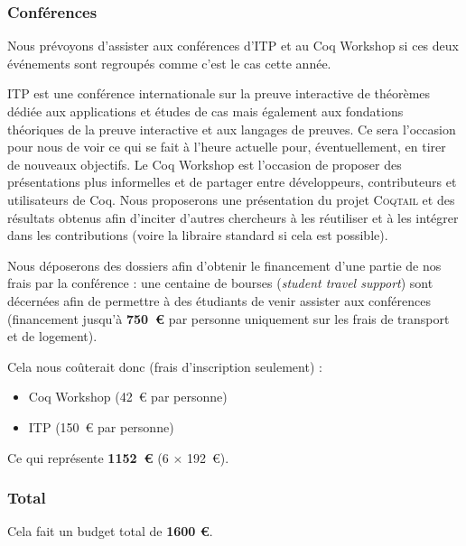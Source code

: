 \documentclass[11pt]{article}
\newcommand{\coqtail}{\textsc{Coqtail}}
\begin{document}
\subsubsection{Conférences}
Nous prévoyons d'assister aux conférences d'ITP et au Coq Workshop si ces deux événements sont regroupés comme c'est le cas cette année.

ITP est une conférence internationale sur la preuve interactive de théorèmes dédiée aux applications et études de cas mais également aux fondations théoriques de la preuve interactive et aux langages de preuves. Ce sera l'occasion pour nous de voir ce qui se fait à l'heure actuelle pour, éventuellement, en tirer de nouveaux objectifs. Le Coq Workshop est l'occasion de proposer des présentations plus informelles et de partager entre développeurs, contributeurs et utilisateurs de Coq. Nous proposerons une présentation du projet \coqtail{} et des résultats obtenus afin d'inciter d'autres chercheurs à les réutiliser et à les intégrer dans les contributions (voire la libraire standard si cela est possible).

Nous déposerons des dossiers afin d'obtenir le financement d'une partie de nos frais par la conférence : une centaine de bourses (\emph{student travel support}) sont décernées afin de permettre à des étudiants de venir assister aux conférences (financement jusqu'à \textbf{750~€} par personne uniquement sur les frais de transport et de logement).

Cela nous coûterait donc (frais d'inscription seulement) :
\begin{itemize}
	\item Coq Workshop (42~€ par personne)
	\item ITP (150~€ par personne)
\end{itemize}

Ce qui représente \textbf{1152~€} (6 $\times$ 192~€).

\subsubsection{Total}

Cela fait un budget total de \textbf{1600 €}.

\printbibliography
\end{document}
